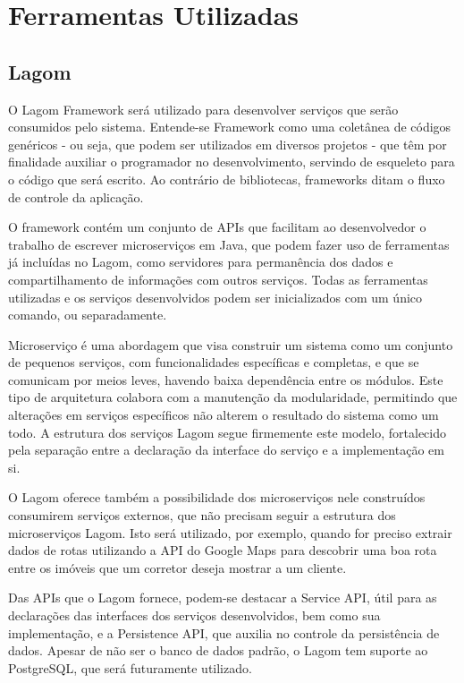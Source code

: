 \documentclass[a4paper,11pt,fleqn]{article}
\begin{document}
\section{Ferramentas Utilizadas}
\label{s:ferramentas}
\subsection{Lagom}
\label{ss:lagom}
O Lagom Framework será utilizado para desenvolver serviços que serão consumidos pelo sistema.
 Entende-se Framework como uma coletânea de códigos genéricos - ou seja, que podem ser utilizados em diversos
  projetos - que têm por finalidade auxiliar o programador no desenvolvimento, servindo de esqueleto
   para o código que será escrito. Ao contrário de bibliotecas, frameworks ditam o fluxo de controle da aplicação.


O framework contém um conjunto de APIs que facilitam ao desenvolvedor o trabalho de escrever microserviços em Java, que
 podem fazer uso de ferramentas já incluídas no Lagom, como servidores para permanência dos dados e compartilhamento de informações
  com outros serviços. Todas as ferramentas utilizadas e os serviços desenvolvidos podem ser inicializados com um único
   comando, ou separadamente.

Microserviço é uma abordagem que visa construir um sistema como um conjunto de pequenos serviços, com funcionalidades
 específicas e completas, e que se comunicam por meios leves, havendo baixa dependência entre os módulos. Este tipo
  de arquitetura colabora com a manutenção da modularidade, permitindo que alterações em serviços específicos não alterem o resultado
   do sistema como um todo. A estrutura dos serviços Lagom segue firmemente este modelo, fortalecido pela separação entre a declaração da interface do
    serviço e a implementação em si.

O Lagom oferece também a possibilidade dos microserviços nele construídos consumirem serviços externos, que não
 precisam seguir a estrutura dos microserviços Lagom. Isto será utilizado, por exemplo, quando for preciso extrair dados de rotas utilizando a API do Google Maps
  para descobrir uma boa rota entre os imóveis que um corretor deseja mostrar a um cliente.

Das APIs que o Lagom fornece, podem-se destacar a Service API, útil para as declarações das interfaces dos serviços desenvolvidos, bem como sua
 implementação, e a Persistence API, que auxilia no controle da persistência de dados. Apesar de não ser o banco de dados padrão, o Lagom
  tem suporte ao PostgreSQL, que será futuramente utilizado.
\end{document}
